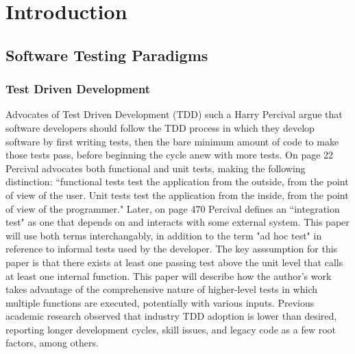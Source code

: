\section{Introduction}\label{sec:introduction}

\subsection{Software Testing Paradigms}\label{sec:intro-3}

\subsubsection{Test Driven Development}\label{sec:intro-}
Advocates of Test Driven Development (TDD) such a Harry Percival
 \cite{percival2014test} argue that software developers should
follow the TDD process in which they develop software by first writing tests,
then the bare minimum amount of code to make those tests pass,
before beginning the cycle anew with more tests.
%
On page 22 \cite{percival2014test} Percival advocates both functional and
 unit tests, making the following distinction:
“functional tests test the application from the outside, from the point of view
of the user. Unit tests test the application from the inside,
from the point of view of the programmer."
%
Later, on page 470 \cite{percival2014test} Percival defines an “integration test" as
one that depends on and interacts with some external system.
%
This paper will use both terms interchangably, in addition to the term 
"ad hoc test" in reference to informal tests used by the developer.  
The key asssumption for this paper is that there exists at least one passing 
test above the unit level that calls at least one internal function.  This 
paper will describe how the author's work takes advantage of the 
comprehensive nature of higher-level tests in which multiple functions are 
executed, potentially with various inputs.
%
Previous academic research \cite{causevic2011factors, ramzan2024test} observed
 that industry TDD adoption is lower than desired,
reporting longer development cycles, skill issues, and legacy code as 
a few root factors, among others.
%
